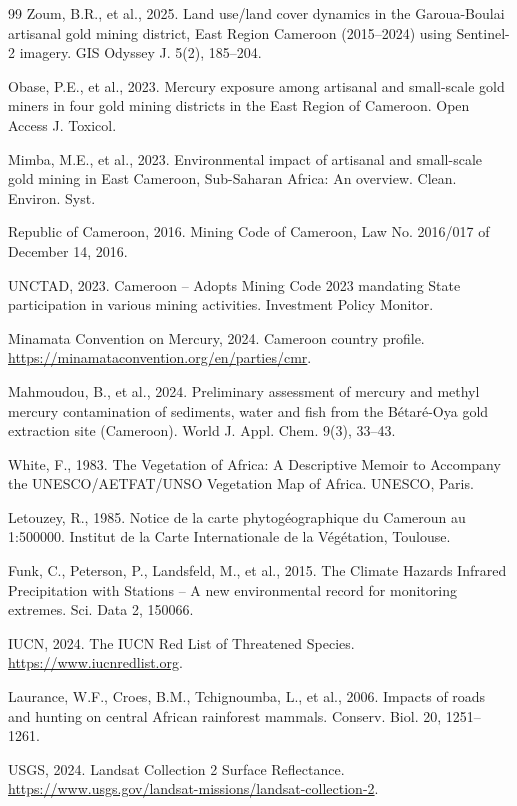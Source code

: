 \documentclass[preprint,12pt,number]{elsarticle}
\begin{document}
\begin{thebibliography}{99}
Zoum, B.R., et al., 2025. Land use/land cover dynamics in the Garoua-Boulai artisanal gold mining district, East Region Cameroon (2015--2024) using Sentinel-2 imagery. GIS Odyssey J. 5(2), 185--204.

Obase, P.E., et al., 2023. Mercury exposure among artisanal and small-scale gold miners in four gold mining districts in the East Region of Cameroon. Open Access J. Toxicol.

Mimba, M.E., et al., 2023. Environmental impact of artisanal and small-scale gold mining in East Cameroon, Sub-Saharan Africa: An overview. Clean. Environ. Syst.

Republic of Cameroon, 2016. Mining Code of Cameroon, Law No. 2016/017 of December 14, 2016.

UNCTAD, 2023. Cameroon -- Adopts Mining Code 2023 mandating State participation in various mining activities. Investment Policy Monitor.

Minamata Convention on Mercury, 2024. Cameroon country profile. \url{https://minamataconvention.org/en/parties/cmr}.

Mahmoudou, B., et al., 2024. Preliminary assessment of mercury and methyl mercury contamination of sediments, water and fish from the B\'{e}tar\'{e}-Oya gold extraction site (Cameroon). World J. Appl. Chem. 9(3), 33--43.

White, F., 1983. The Vegetation of Africa: A Descriptive Memoir to Accompany the UNESCO/AETFAT/UNSO Vegetation Map of Africa. UNESCO, Paris.

Letouzey, R., 1985. Notice de la carte phytog\'{e}ographique du Cameroun au 1:500000. Institut de la Carte Internationale de la V\'{e}g\'{e}tation, Toulouse.

Funk, C., Peterson, P., Landsfeld, M., et al., 2015. The Climate Hazards Infrared Precipitation with Stations -- A new environmental record for monitoring extremes. Sci. Data 2, 150066.

IUCN, 2024. The IUCN Red List of Threatened Species. \url{https://www.iucnredlist.org}.

Laurance, W.F., Croes, B.M., Tchignoumba, L., et al., 2006. Impacts of roads and hunting on central African rainforest mammals. Conserv. Biol. 20, 1251--1261.

USGS, 2024. Landsat Collection 2 Surface Reflectance. \url{https://www.usgs.gov/landsat-missions/landsat-collection-2}.


\end{thebibliography}
\end{document}
